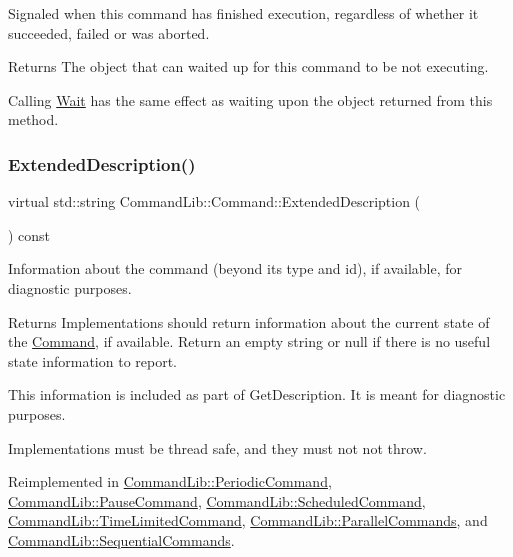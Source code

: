 Signaled when this command has finished execution, regardless of whether it succeeded, failed or was aborted. 

\begin{DoxyReturn}{Returns}
The object that can waited up for this command to be not executing.
\end{DoxyReturn}


Calling \mbox{\hyperlink{class_command_lib_1_1_command_ac4d49fbf9bbcc543fb57e4b04edf1ddb}{Wait}} has the same effect as waiting upon the object returned from this method. \mbox{\label{class_command_lib_1_1_command_a795a185509e7b0fc1606b3b62fe17fbb}} 
\subsubsection{\texorpdfstring{Extended\+Description()}{ExtendedDescription()}}
{\footnotesize\ttfamily virtual std\+::string Command\+Lib\+::\+Command\+::\+Extended\+Description (\begin{DoxyParamCaption}{ }\end{DoxyParamCaption}) const\hspace{0.3cm}{\ttfamily [virtual]}}



Information about the command (beyond its type and id), if available, for diagnostic purposes. 

\begin{DoxyReturn}{Returns}
Implementations should return information about the current state of the \mbox{\hyperlink{class_command_lib_1_1_command}{Command}}, if available. Return an empty string or null if there is no useful state information to report. 
\end{DoxyReturn}


This information is included as part of Get\+Description. It is meant for diagnostic purposes. 

Implementations must be thread safe, and they must not not throw. 

Reimplemented in \mbox{\hyperlink{class_command_lib_1_1_periodic_command_a330571debdbd7f7b306dd7f2718e84e5}{Command\+Lib\+::\+Periodic\+Command}}, \mbox{\hyperlink{class_command_lib_1_1_pause_command_a211772cefb139755c74495f190a9a607}{Command\+Lib\+::\+Pause\+Command}}, \mbox{\hyperlink{class_command_lib_1_1_scheduled_command_a3a4da8459441ce57379753e947467025}{Command\+Lib\+::\+Scheduled\+Command}}, \mbox{\hyperlink{class_command_lib_1_1_time_limited_command_aaf7018c66b91a5d1a519325b99dc3f55}{Command\+Lib\+::\+Time\+Limited\+Command}}, \mbox{\hyperlink{class_command_lib_1_1_parallel_commands_a5c079ef465fe007bc3b8e893554c5610}{Command\+Lib\+::\+Parallel\+Commands}}, and \mbox{\hyperlink{class_command_lib_1_1_sequential_commands_a8109d8d9b2c4a191cad02164ca173709}{Command\+Lib\+::\+Sequential\+Commands}}.

